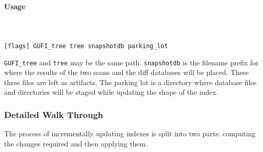 \paragraph{Usage} ~\\\\
\gufiincrementalupdate \texttt{[flags] GUFI\_tree tree snapshotdb
parking\_lot} \

\texttt{GUFI\_tree} and \texttt{tree} may be the same
path. \texttt{snapshotdb} is the filename prefix for where the results
of the two scans and the diff databases will be placed. These three files
are left as artifacts. The parking lot is a directory where database
files and directories will be staged while updating the shape of the index.

\subsubsection{Detailed Walk Through}

The process of incrementally updating indexes is split into two parts:
computing the changes required and then applying them.

